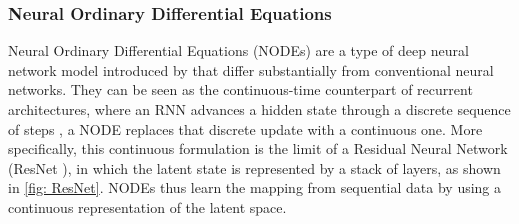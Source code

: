 



\subsubsection{Neural Ordinary Differential Equations}
\label{subsubsect: NODEs}

Neural Ordinary Differential Equations (NODEs) are a type of deep neural network model introduced by \textcite{Chen2018} that differ substantially from conventional neural networks. They can be seen as the continuous-time counterpart of recurrent architectures, where an RNN advances a hidden state through a discrete sequence of steps \cite{Aggarwal2018}, a NODE replaces that discrete update with a continuous one. More specifically, this continuous formulation is the limit of a Residual Neural Network (ResNet \cite{He2015}), in which the latent state is represented by a stack of layers, as shown in \autoref{fig: ResNet}. NODEs thus learn the mapping from sequential data by using a continuous representation of the latent space.

